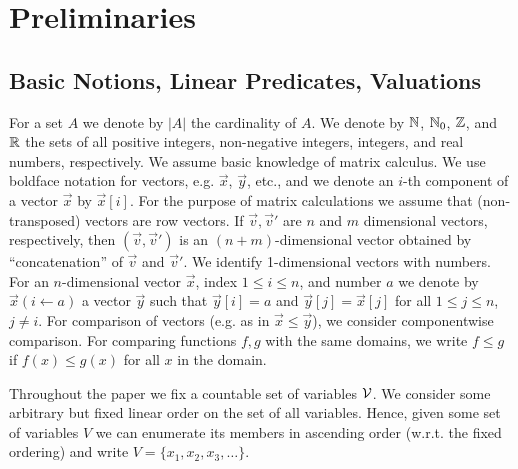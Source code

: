 
\vspace{-1em}
\section{Preliminaries}\label{sec:prelim}

\vspace{-1em}
\subsection{Basic Notions, Linear Predicates, Valuations}
\vspace{-0.5em}
For a set $A$ we denote by $|A|$ the cardinality of $A$. We denote by $\mathbb{N}$,
$\mathbb{N}_0$, $\mathbb{Z}$, and $\mathbb{R}$ the sets of all positive integers, non-negative
integers, integers, and real numbers, respectively. We assume basic knowledge 
of matrix calculus.
We use boldface notation for
vectors, e.g. $\vec{x}$, $\vec{y}$, etc., and we denote an $i$-th component of a
vector $\vec{x}$ by $\vec{x}[i]$. For the purpose of matrix calculations we 
assume that (non-transposed) vectors are row vectors. If $\vec{v},\vec{v}'$ are 
$n$ and $m$ dimensional vectors, respectively, then $(\vec{v},\vec{v}')$ is an 
$(n+m)$-dimensional vector obtained by ``concatenation'' of $\vec{v}$ and 
$\vec{v}'$. We identify 1-dimensional vectors with numbers. For an 
$n$-dimensional vector 
$\vec{x}$, index $1 \leq i\leq n$, and number $a$ we denote by $\vec{x}(i\leftarrow a)$ 
a 
vector $\vec{y}$ such that $\vec{y}[i]=a$ and $\vec{y}[j]=\vec{x}[j]$ for all 
$1\leq j \leq n$, $j\neq i$.
For comparison of vectors (e.g. as in $\vec{x}\leq \vec{y}$), we consider componentwise 
comparison. 
For comparing functions $f,g$ with the same domains, we write $f\leq g$ 
if $f(x)\leq g(x)$ for all $x$ in the domain.


\smallskip{}
Throughout the paper we fix a countable set of variables $\mathcal{V}$. 
We consider some arbitrary but fixed linear order on the set of all variables. 
Hence, given some set of variables $V$ we can enumerate its members in 
ascending order (w.r.t. the fixed ordering) and write 
$V=\{x_1,x_2,x_3,\dots\}$. 


